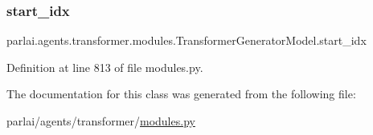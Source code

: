 \subsubsection{\texorpdfstring{start\+\_\+idx}{start\_idx}}
{\footnotesize\ttfamily parlai.\+agents.\+transformer.\+modules.\+Transformer\+Generator\+Model.\+start\+\_\+idx}



Definition at line 813 of file modules.\+py.



The documentation for this class was generated from the following file\+:\begin{DoxyCompactItemize}
\item 
parlai/agents/transformer/\hyperlink{parlai_2agents_2transformer_2modules_8py}{modules.\+py}\end{DoxyCompactItemize}
